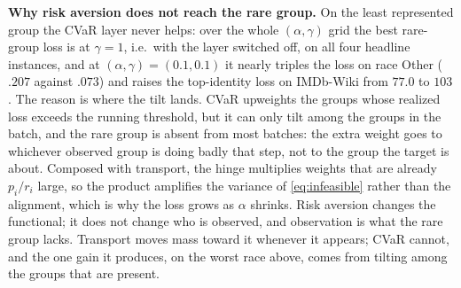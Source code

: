 \noindent\textbf{Why risk aversion does not reach the rare group.}
On the least represented group the CVaR layer never helps: over the whole
$(\alpha,\gamma)$ grid the best rare-group loss is at $\gamma{=}1$, i.e.\ with
the layer switched off, on all four headline instances, and at
$(\alpha,\gamma)=(0.1,0.1)$ it nearly triples the loss on race Other
($.207$ against $.073$) and raises the top-identity loss on IMDb-Wiki from
$77.0$ to $103$. The reason is where the tilt lands. CVaR upweights the
groups whose realized loss exceeds the running threshold, but it can only
tilt among the groups in the batch, and the rare group is absent from most
batches: the extra weight goes to whichever observed group is doing badly
that step, not to the group the target is about. Composed with transport,
the hinge multiplies weights that are already $p_i/r_i$ large, so the
product amplifies the variance of \eqref{eq:infeasible} rather than the
alignment, which is why the loss grows as $\alpha$ shrinks. Risk aversion
changes the functional; it does not change who is observed, and observation
is what the rare group lacks. Transport moves mass toward it whenever it
appears; CVaR cannot, and the one gain it produces, on the worst race above,
comes from tilting among the groups that are present.

